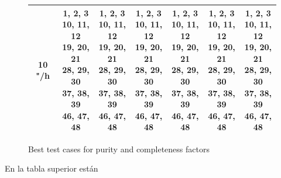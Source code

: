 \documentclass{article}
\begin{document}
\begin{figure}[H]
\begin{tabular}{|c|c|c|c|c|c|c|}
10 "/h & \makecell{1, 2, 3 \\ 10, 11, 12 \\ 19, 20, 21 \\ 28, 29, 30 \\ 37, 38, 39 \\ 46, 47, 48} & \makecell{1, 2, 3 \\ 10, 11, 12 \\ 19, 20, 21 \\ 28, 29, 30 \\ 37, 38, 39 \\ 46, 47, 48} & \makecell{1, 2, 3 \\ 10, 11, 12 \\ 19, 20, 21 \\ 28, 29, 30 \\ 37, 38, 39 \\ 46, 47, 48} & \makecell{1, 2, 3 \\ 10, 11, 12 \\ 19, 20, 21 \\ 28, 29, 30 \\ 37, 38, 39 \\ 46, 47, 48} & \makecell{1, 2, 3 \\ 10, 11, 12 \\ 19, 20, 21 \\ 28, 29, 30 \\ 37, 38, 39 \\ 46, 47, 48} & \makecell{1, 2, 3 \\ 10, 11, 12 \\ 19, 20, 21 \\ 28, 29, 30 \\ 37, 38, 39 \\ 46, 47, 48}\\
\hline
\end{tabular}
\caption{Best test cases for purity and completeness factors}
\end{figure}

En la tabla superior están 
\end{document}
